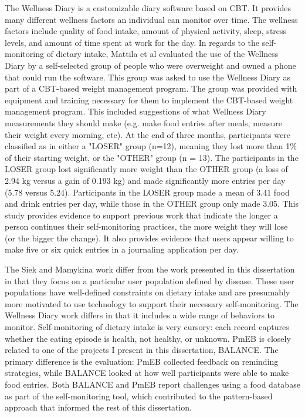 The Wellness Diary \citep{mattila_mobile_2008, ahtinen_user_2009, mattila_nuadu_2008, koskinen_customizable_2007, van_gils_feasibility_2001} is a  customizable diary software based on CBT. It provides many different wellness factors an individual can monitor over time. The wellness factors include quality of food intake, amount of physical activity, sleep, stress levels, and amount of time spent at work for the day. In regards to the self-monitoring of dietary intake, Mattila et al evaluated the use of the Wellness Diary by a self-selected group of people who were overweight and owned a phone that could run the software. This group was asked to use the Wellness Diary as part of a CBT-based weight management program. The group was provided with equipment and training necessary for them to implement the CBT-based weight management program. This included suggestions of what Wellness Diary measurements they should make (e.g. make food entries after meals, measure their weight every morning, etc). At the end of three months, participants were classified as in either a "LOSER" group (n=12), meaning they lost more than 1\% of their starting weight, or the "OTHER" group (n = 13). The participants in the LOSER group lost significantly more weight than the OTHER group (a loss of 2.94 kg versus a gain of 0.193 kg) and made significantly more entries per day (5.78 versus 5.24). Participants in the LOSER group made a mean of 3.41 food and drink entries per day, while those in the OTHER group only made 3.05. This study provides evidence to support previous work that indicate the longer a person continues their self-monitoring practices, the more weight they will lose (or the bigger the change). It also provides evidence that users appear willing to make five or six quick entries in a journaling application per day. 

The Siek and Mamykina work differ from the work presented in this dissertation in that they focus on a particular user population defined by disease. These user populations have well-defined constraints on dietary intake and are presumably more motivated to use technology to support their necessary self-monitoring. The Wellness Diary work differs in that it includes a wide range of behaviors to monitor. Self-monitoring of dietary intake is very cursory: each record captures whether the eating episode is health, not healthy, or unknown. PmEB is closely related to one of the projects I present in this dissertation, BALANCE. The primary difference is the evaluation: PmEB collected feedback on reminding strategies, while BALANCE looked at how well participants were able to make food entries. Both BALANCE and PmEB report challenges using a food database as part of the self-monitoring tool, which contributed to the pattern-based approach that informed the rest of this dissertation. 

